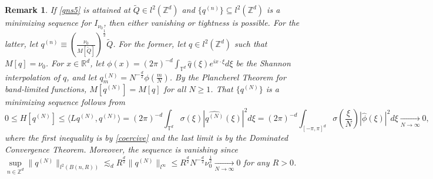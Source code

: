 \documentclass{article}
\numberwithin{equation}{section}
\newtheorem{remark}{Remark}[section]
\begin{document}
\begin{remark}
    If \eqref{gns5} is attained at $\tilde{Q} \in l^2(\mathbb{Z}^d)$ and $\{q^{(n)}\} \subseteq l^2(\mathbb{Z}^d)$ is a minimizing sequence for $I_{\nu_0}$, then either vanishing or tightness is possible. For the latter, let $q^{(n)} \equiv \left(\frac{\nu_0}{M[\tilde{Q}]}\right)^{\frac{1}{2}}\tilde{Q}$. For the former, let $q \in l^2(\mathbb{Z}^d)$ such that $M[q] = \nu_0$. For $x \in \mathbb{R}^d$, let $\phi(x) = (2\pi)^{-d} \int_{\mathbb{T}^d} \widehat{q}(\xi) e^{i x \cdot \xi} d\xi$ be the Shannon interpolation of $q$, and let $q^{(N)}_{m} = N^{-\frac{d}{2}} \phi\left(\frac{m}{N}\right)$. By the Plancherel Theorem for band-limited functions, $M[q^{(N)}] = M[q]$ for all $N \geq 1$. That $\{ q^{(N)} \}$ is a minimizing sequence follows from
    \begin{equation*}
        0 \leq H[q^{(N)}] \leq \langle Lq^{(N)},q^{(N)}\rangle = (2\pi)^{-d}  \int_{\mathbb{T}^d} \sigma(\xi) |\widehat{q^{(N)}}(\xi)|^2 d\xi = (2\pi)^{-d} \int_{[-\pi,\pi]^d} \sigma\left(\frac{\xi}{N}\right)|\widehat{\phi}(\xi)|^2 d\xi \xrightarrow[N \rightarrow \infty]{} 0,
    \end{equation*}
    where the first inequality is by \eqref{coercive} and the last limit is by the Dominated Convergence Theorem. Moreover, the sequence is vanishing since $\sup\limits_{n \in \mathbb{Z}^d}\| q^{(N)}\|_{l^2 (B(n,R))} \lesssim_d R^{\frac{d}{2}} \| q^{(N)} \|_{l^\infty } \leq R^{\frac{d}{2}} N^{-\frac{d}{2}} \nu_0^{\frac{1}{2}} \xrightarrow[N \rightarrow \infty]{}0$ for any $R>0$.   
\end{remark}
\end{document}
